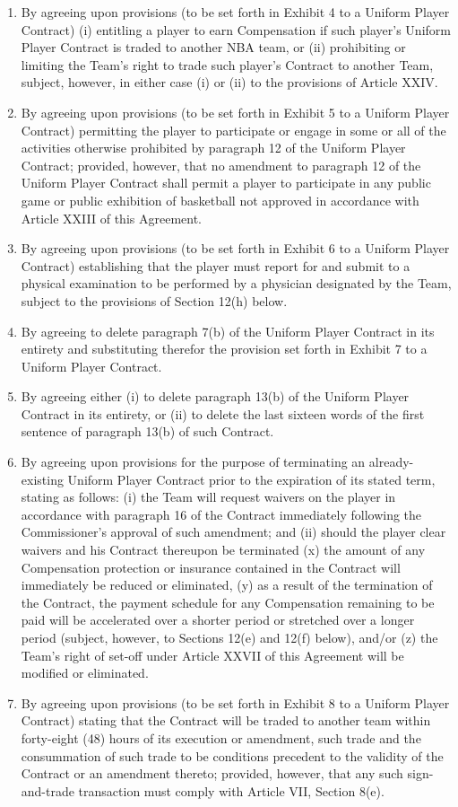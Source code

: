 \documentclass[
]{book}
\begin{document}
\begin{enumerate}
\item
  By agreeing upon provisions (to be set forth in Exhibit 4 to a Uniform Player Contract) (i) entitling a player to earn Compensation if such player's Uniform Player Contract is traded to another NBA team, or (ii) prohibiting or limiting the Team's right to trade such player's Contract to another Team, subject, however, in either case (i) or (ii) to the provisions of Article XXIV.
\item
  By agreeing upon provisions (to be set forth in Exhibit 5 to a Uniform Player Contract) permitting the player to participate or engage in some or all of the activities otherwise prohibited by paragraph 12 of the Uniform Player Contract; provided, however, that no amendment to paragraph 12 of the Uniform Player Contract shall permit a player to participate in any public game or public exhibition of basketball not approved in accordance with Article XXIII of this Agreement.
\item
  By agreeing upon provisions (to be set forth in Exhibit 6 to a Uniform Player Contract) establishing that the player must report for and submit to a physical examination to be performed by a physician designated by the Team, subject to the provisions of Section 12(h) below.
\item
  By agreeing to delete paragraph 7(b) of the Uniform Player Contract in its entirety and substituting therefor the provision set forth in Exhibit 7 to a Uniform Player Contract.
\item
  By agreeing either (i) to delete paragraph 13(b) of the Uniform Player Contract in its entirety, or (ii) to delete the last sixteen words of the first sentence of paragraph 13(b) of such Contract.
\item
  By agreeing upon provisions for the purpose of terminating an already-existing Uniform Player Contract prior to the expiration of its stated term, stating as follows: (i) the Team will request waivers on the player in accordance with paragraph 16 of the Contract immediately following the Commissioner's approval of such amendment; and (ii) should the player clear waivers and his Contract thereupon be terminated (x) the amount of any Compensation protection or insurance contained in the Contract will immediately be reduced or eliminated, (y) as a result of the termination of the Contract, the payment schedule for any Compensation remaining to be paid will be accelerated over a shorter period or stretched over a longer period (subject, however, to Sections 12(e) and 12(f) below), and/or (z) the Team's right of set-off under Article XXVII of this Agreement will be modified or eliminated.
\item
  By agreeing upon provisions (to be set forth in Exhibit 8 to a Uniform Player Contract) stating that the Contract will be traded to another team within forty-eight (48) hours of its execution or amendment, such trade and the consummation of such trade to be conditions precedent to the validity of the Contract or an amendment thereto; provided, however, that any such sign-and-trade transaction must comply with Article VII, Section 8(e).
\end{enumerate}
\end{document}
